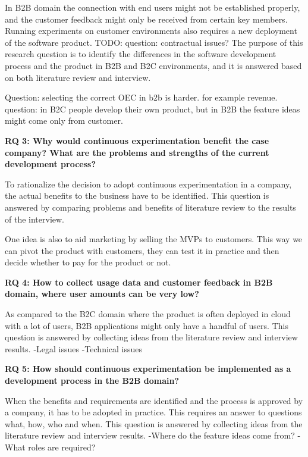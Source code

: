 \documentclass[english]{tktltiki2}
\theoremstyle{definition}
\theoremstyle{remark}
\begin{document}
\noindent In B2B domain the connection with end users might not be established properly, and the customer feedback might only be received from certain key members. Running experiments on customer environments also requires a new deployment of the software product. TODO: question: contractual issues? The purpose of this research question is to identify the differences in the software development process and the product in B2B and B2C environments, and it is answered based on both literature review and interview. \newline

Question: selecting the correct OEC in b2b is harder. for example revenue. 
question: in B2C people develop their own product, but in B2B the feature ideas might come only from customer.

\noindent \textbf{RQ 3: Why would continuous experimentation benefit the case company? What are the problems and strengths of the current development process?}

\noindent To rationalize the decision to adopt continuous experimentation in a company, the actual benefits to the business have to be identified. This question is answered by comparing problems and benefits of literature review to the results of the interview. \newline

One idea is also to aid marketing by selling the MVPs to customers. This way we can pivot the product with customers, they can test it in practice and then decide whether to pay for the product or not.

\noindent \textbf{RQ 4: How to collect usage data and customer feedback in B2B domain, where user amounts can be very low?}

\noindent As compared to the B2C domain where the product is often deployed in cloud with a lot of users, B2B applications might only have a handful of users. This question is answered by collecting ideas from the literature review and interview results. \newline
-Legal issues
-Technical issues

\noindent \textbf{RQ 5: How should continuous experimentation be implemented as a development process in the B2B domain?}

\noindent When the benefits and requirements are identified and the process is approved by a company, it has to be adopted in practice. This requires an answer to questions what, how, who and when. This question is answered by collecting ideas from the literature review and interview results. \newline
-Where do the feature ideas come from?
-What roles are required?
\end{document}

